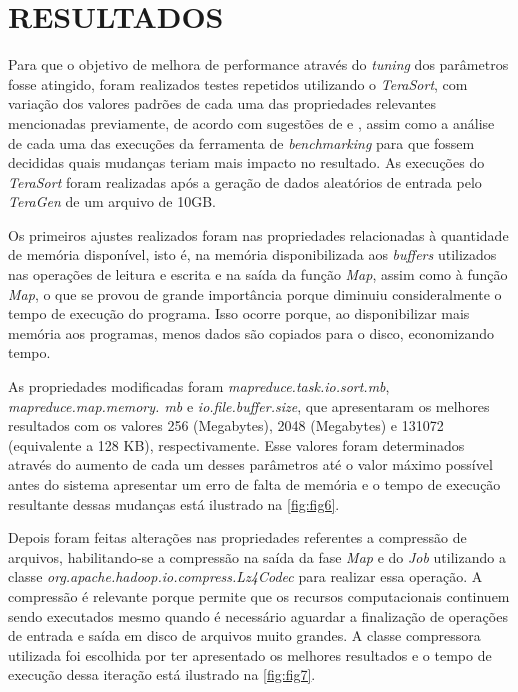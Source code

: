 \section{RESULTADOS} \label{sec:resultados}

Para que o objetivo de melhora de performance através do \textit{\gls{tuning}} dos parâmetros fosse atingido, foram realizados testes repetidos utilizando o \textit{TeraSort}, com variação dos valores padrões de cada uma das propriedades relevantes mencionadas previamente, de acordo com sugestões de \textcite{HadoopBook15} e \textcite{ProHadoop09}, assim como a análise de cada uma das execuções da ferramenta de \textit{\gls{benchmark}ing} para que fossem decididas quais mudanças teriam mais impacto no resultado. As execuções do \textit{TeraSort} foram realizadas após a geração de dados aleatórios de entrada pelo \textit{TeraGen} de um arquivo de 10GB.

Os primeiros ajustes realizados foram nas propriedades relacionadas à quantidade de memória disponível, isto é, na memória disponibilizada aos \textit{\gls{buffer}s} utilizados nas operações de leitura e escrita e na saída da função \textit{Map}, assim como à função \textit{Map}, o que se provou de grande importância porque diminuiu consideralmente o tempo de execução do programa. Isso ocorre porque, ao disponibilizar mais memória aos programas, menos dados são copiados para o disco, economizando tempo.

As propriedades modificadas foram \textit{mapreduce.task.io.sort.mb}, \textit{mapreduce.map.memory. mb} e \textit{io.file.buffer.size}, que apresentaram os melhores resultados com os valores 256 (Megabytes), 2048 (Megabytes) e 131072 (equivalente a 128 KB), respectivamente. Esse valores foram determinados através do aumento de cada um desses parâmetros até o valor máximo possível antes do sistema apresentar um erro de falta de memória e o tempo de execução resultante dessas mudanças está ilustrado na \autoref{fig:fig6}.


Depois foram feitas alterações nas propriedades referentes a compressão de arquivos, habilitando-se a compressão na saída da fase \textit{Map} e do \textit{Job} utilizando a classe \textit{org.apache.hadoop.io.compress.Lz4Codec} para realizar essa operação. A compressão é relevante porque permite que os recursos computacionais continuem sendo executados mesmo quando é necessário aguardar a finalização de operações de entrada e saída em disco de arquivos muito grandes. A classe compressora utilizada foi escolhida por ter apresentado os melhores resultados e o tempo de execução dessa iteração está ilustrado na \autoref{fig:fig7}.

